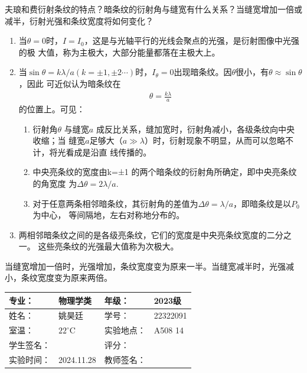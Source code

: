 \documentclass[dvipsnames, svgnames,a4paper,11pt]{article}
\begin{document}
\begin{question}
    夫琅和费衍射条纹的特点？暗条纹的衍射角与缝宽有什么关系？当缝宽增加一倍或减半，衍射光强和条纹宽度将如何变化？
    \tcblower
    \begin{enumerate}
        \item 当$\theta=0$时，$I=I_0$，这是与光轴平行的光线会聚点的光强，是衍射图像中光强的极
        大值，称为主极大，大部分能量都落在主极大上。
        \item 当$\sin\theta=k\lambda/a(k=\pm1,\pm2\cdots)$时，$I_\theta=0$出现暗条纹。因$\theta$很小，有$\theta\approx \sin\theta$，因此
        可近似认为暗条纹在
        \begin{align*}
            \theta=\frac{k\lambda}{a}
        \end{align*}
        的位置上。可见：\begin{enumerate}
            \item 衍射角$\theta$ 与缝宽$a$ 成反比关系，缝加宽时，衍射角减小，各级条纹向中央收缩；当
            缝宽$a$足够大（$a\gg\lambda$）时，衍射现象不明显，从而可以忽略不计，将光看成是沿直
            线传播的。
            \item 中央亮条纹的宽度由k=±1 的两个暗条纹的衍射角所确定，即中央亮条纹的角宽度
            为$\Delta\theta=2\lambda/a$.
            \item 对于任意两条相邻暗条纹，其衍射角的差值为$\Delta\theta=\lambda/a$，即暗条纹是以$P_0$ 为中心，
            等间隔地，左右对称地分布的。
        \end{enumerate}
        \item 两相邻暗条纹之间的是各级亮条纹，它们的宽度是中央亮条纹宽度的二分之一。
        这些亮条纹的光强最大值称为次极大。
    \end{enumerate}
    当缝宽增加一倍时，光强增加，条纹宽度变为原来一半。当缝宽减半时，光强减小，条纹宽度变为原来两倍。
\end{question}



\clearpage
{}
\begin{table}
	\renewcommand\arraystretch{1.7}
	\centering
	\begin{tabularx}{\textwidth}{|X|X|X|X|}
	\hline
	专业：& 物理学类 &年级：& 2023级 \\
	\hline
	姓名： &姚昊廷& 学号：&22322091  \\
	\hline
	室温：&$22^\circ$C&实验地点：&A508  14\\
	\hline
	学生签名：& & 评分： &\\
	\hline
	实验时间：& 2024.11.28& 教师签名：&\\
	\hline
	\end{tabularx}
\end{table}
\end{document}
